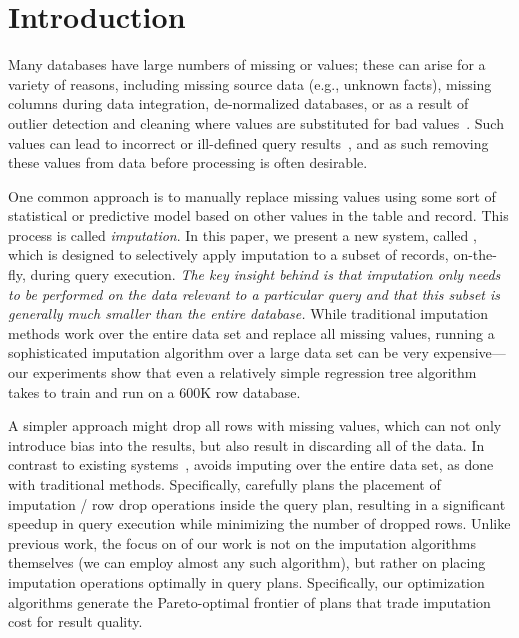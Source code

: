 \section{Introduction}

Many databases have large numbers of missing or \nullv{} values;  these can arise for a variety of reasons, including missing source data (e.g., unknown facts),
missing columns during data integration, de-normalized databases, or as a result of outlier detection and cleaning where \nullv{} values are substituted for
bad values~\cite{kim2003}.  Such \nullv{} values can lead to incorrect or ill-defined query results~\cite{rubin1976}, and as such removing these values from data
before processing is often desirable.

One common approach is to manually replace missing values using some sort of statistical or predictive model based on other values in the table and record.
This process is called \emph{imputation}.
In this paper, we present a new system, called \ProjectName{}, which is designed to selectively apply imputation to a subset of records, on-the-fly, during query execution.  \emph{The key insight behind \ProjectName{} is that imputation
only needs to be performed on the data relevant to a particular query and
that this subset is generally much smaller than the entire database.}  
While traditional imputation methods work over the entire data set and replace all missing values, running a sophisticated imputation algorithm over a large data set can be very expensive---our experiments show that even a relatively simple regression tree algorithm takes \acsbaseresulthours{} to train and run
on a 600K row database.

A simpler approach might drop all rows with missing values, which can not only introduce bias into the results, but also result in discarding all of the data.
In contrast to existing systems~\cite{burgette2010multiple,akande2015empirical}, \ProjectName{} avoids imputing over the entire data set, as done with traditional methods. Specifically, \ProjectName{}
carefully plans the placement of imputation / row drop operations inside the query plan, resulting in a 
significant speedup in query execution while minimizing the number of dropped rows. Unlike previous work, the focus on of our work is not on the imputation algorithms themselves (we can employ almost any such algorithm), but rather on placing imputation operations
optimally in query plans. Specifically, our optimization algorithms generate the Pareto-optimal frontier of plans that trade imputation cost for result quality.


